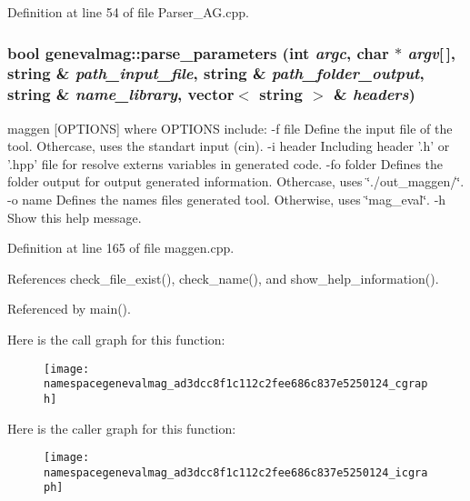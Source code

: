 Definition at line 54 of file Parser\_\-AG.cpp.

\hypertarget{namespacegenevalmag_ad3dcc8f1c112c2fee686c837e5250124}{
\subsubsection[{parse\_\-parameters}]{\setlength{\rightskip}{0pt plus 5cm}bool genevalmag::parse\_\-parameters (int {\em argc}, \/  char $\ast$ {\em argv}\mbox{[}$\,$\mbox{]}, \/  string \& {\em path\_\-input\_\-file}, \/  string \& {\em path\_\-folder\_\-output}, \/  string \& {\em name\_\-library}, \/  vector$<$ string $>$ \& {\em headers})}}
\label{namespacegenevalmag_ad3dcc8f1c112c2fee686c837e5250124}
maggen \mbox{[}OPTIONS\mbox{]} where OPTIONS include: -\/f file Define the input file of the tool. Othercase, uses the standart input (cin). -\/i header Including header '.h' or '.hpp' file for resolve externs variables in generated code. -\/fo folder Defines the folder output for output generated information. Othercase, uses \char`\"{}./out\_\-maggen/\char`\"{}. -\/o name Defines the names files generated tool. Otherwise, uses \char`\"{}mag\_\-eval\char`\"{}. -\/h Show this help message. 

Definition at line 165 of file maggen.cpp.



References check\_\-file\_\-exist(), check\_\-name(), and show\_\-help\_\-information().



Referenced by main().



Here is the call graph for this function:\nopagebreak
\begin{figure}[H]
\begin{center}
\leavevmode
\texttt{[image: namespacegenevalmag\_ad3dcc8f1c112c2fee686c837e5250124\_cgraph]}
\end{center}
\end{figure}




Here is the caller graph for this function:\nopagebreak
\begin{figure}[H]
\begin{center}
\leavevmode
\texttt{[image: namespacegenevalmag\_ad3dcc8f1c112c2fee686c837e5250124\_icgraph]}
\end{center}
\end{figure}



